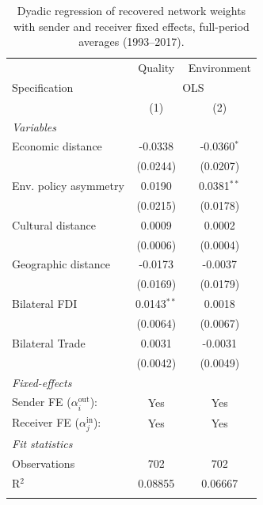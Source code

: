 
\begin{table}[htbp]
   \caption{\label{tab:dyadic_recovered_fp_fe} Dyadic regression of recovered network weights with sender and receiver fixed effects, full-period averages (1993--2017).}
   \centering
   \begin{tabular}{lcc}
      \tabularnewline \midrule \midrule
                                              & Quality       & Environment \\   
      Specification & \multicolumn{2}{c}{OLS} \\ 
                                              & (1)           & (2)\\  
      \midrule
      \emph{Variables}\\
      Economic distance                       & -0.0338       & -0.0360$^{*}$\\   
                                              & (0.0244)      & (0.0207)\\   
      Env. policy asymmetry                   & 0.0190        & 0.0381$^{**}$\\   
                                              & (0.0215)      & (0.0178)\\   
      Cultural distance                       & 0.0009        & 0.0002\\   
                                              & (0.0006)      & (0.0004)\\   
      Geographic distance                     & -0.0173       & -0.0037\\   
                                              & (0.0169)      & (0.0179)\\   
      Bilateral FDI                           & 0.0143$^{**}$ & 0.0018\\   
                                              & (0.0064)      & (0.0067)\\   
      Bilateral Trade                         & 0.0031        & -0.0031\\   
                                              & (0.0042)      & (0.0049)\\   
      \midrule
      \emph{Fixed-effects}\\
      Sender FE ($\alpha_i^{\text{out}}$):    & Yes           & Yes\\  
      Receiver FE ($\alpha_j^{\text{in}}$):   & Yes           & Yes\\  
      \midrule
      \emph{Fit statistics}\\
      Observations                            & 702           & 702\\  
      R$^2$                                   & 0.08855       & 0.06667\\  
      \midrule \midrule & \tabularnewline
   \end{tabular}
   

\end{table}
